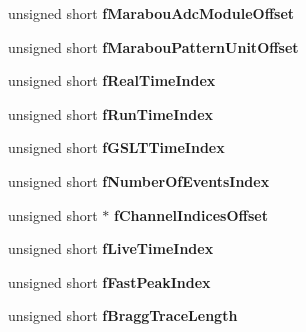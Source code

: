 \begin{DoxyCompactItemize}
\item 
\hypertarget{class_global_settings_acf1502561adce6da14a91b9b90f4d0fc}{unsigned short {\bfseries f\-Marabou\-Adc\-Module\-Offset}}\label{class_global_settings_acf1502561adce6da14a91b9b90f4d0fc}

\item 
\hypertarget{class_global_settings_a1275e401d46401ca89fc32e293642415}{unsigned short {\bfseries f\-Marabou\-Pattern\-Unit\-Offset}}\label{class_global_settings_a1275e401d46401ca89fc32e293642415}

\item 
\hypertarget{class_global_settings_a142b843d3d046e74845672a8177c9de1}{unsigned short {\bfseries f\-Real\-Time\-Index}}\label{class_global_settings_a142b843d3d046e74845672a8177c9de1}

\item 
\hypertarget{class_global_settings_afcd06d4313aede9d4d55fde8c90a6d7f}{unsigned short {\bfseries f\-Run\-Time\-Index}}\label{class_global_settings_afcd06d4313aede9d4d55fde8c90a6d7f}

\item 
\hypertarget{class_global_settings_af6209578839870c7608b5cecbcfc0bd8}{unsigned short {\bfseries f\-G\-S\-L\-T\-Time\-Index}}\label{class_global_settings_af6209578839870c7608b5cecbcfc0bd8}

\item 
\hypertarget{class_global_settings_a0a695f74fb8fb13a7212c03cc1c90d45}{unsigned short {\bfseries f\-Number\-Of\-Events\-Index}}\label{class_global_settings_a0a695f74fb8fb13a7212c03cc1c90d45}

\item 
\hypertarget{class_global_settings_a7b7fde75713d340b0c08b69cf52629b5}{unsigned short $\ast$ {\bfseries f\-Channel\-Indices\-Offset}}\label{class_global_settings_a7b7fde75713d340b0c08b69cf52629b5}

\item 
\hypertarget{class_global_settings_af6b5925fc6dc199bd0859a1d4471f4fb}{unsigned short {\bfseries f\-Live\-Time\-Index}}\label{class_global_settings_af6b5925fc6dc199bd0859a1d4471f4fb}

\item 
\hypertarget{class_global_settings_a909c95bed26cb1703234e1d7bbee812e}{unsigned short {\bfseries f\-Fast\-Peak\-Index}}\label{class_global_settings_a909c95bed26cb1703234e1d7bbee812e}

\item 
\hypertarget{class_global_settings_ad6552c5816c5265d32f930c96cb05897}{unsigned short {\bfseries f\-Bragg\-Trace\-Length}}\label{class_global_settings_ad6552c5816c5265d32f930c96cb05897}


\end{DoxyCompactItemize}
